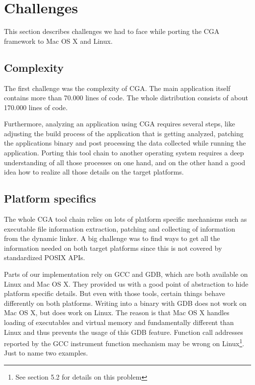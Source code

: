 
\section{Challenges} This section describes challenges we had to face while porting the CGA framework to Mac OS X and Linux.

\subsection{Complexity}

The first challenge was the complexity of CGA. The main application itself contains more than 70.000 lines of code. The whole distribution consists of about 170.000 lines of code.

Furthermore, analyzing an application using CGA requires several steps, like adjusting the build process of the application that is getting analyzed, patching the applications binary and post processing the data collected while running the application. Porting this tool chain to another operating system requires a deep understanding of all those processes on one hand, and on the other hand a good idea how to realize all those details on the target platforms.

\subsection{Platform specifics}

The whole CGA tool chain relies on lots of platform specific mechanisms such as executable file information extraction, patching and collecting of information from the dynamic linker. A big challenge was to find ways to get all the information needed on both target platforms since this is not covered by standardized POSIX APIs.

Parts of our implementation rely on GCC and GDB, which are both available on Linux and Mac OS X. They provided us with a good point of abstraction to hide platform specific details. But even with those tools, certain things behave differently on both platforms. Writing into a binary with GDB does not work on Mac OS X, but does work on Linux.  The reason is that Mac OS X handles loading of executables and virtual memory and fundamentally different than Linux and thus prevents the usage of this GDB feature.  Function call addresses reported by the GCC instrument function mechanism may be wrong on Linux\footnote{See section 5.2 for details on this problem}. Just to name two examples.


